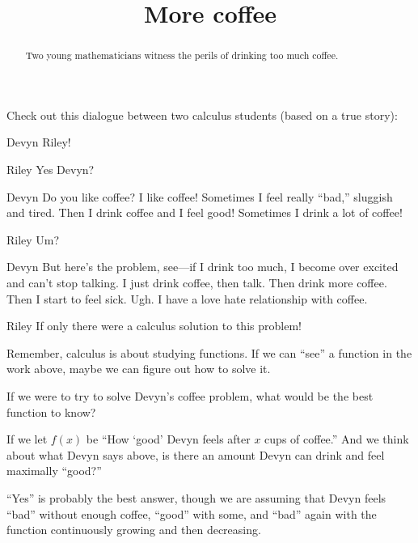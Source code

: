 \documentclass{ximera}
\title[Break-Ground:]{More coffee}
\begin{document}
\begin{abstract}
Two young mathematicians witness the perils of drinking too much
coffee.
\end{abstract}
\maketitle

Check out this dialogue between two calculus students (based on a true
story):

\begin{dialogue}
\item[Devyn] Riley! 
\item[Riley] Yes Devyn?
\item[Devyn] Do you like coffee? I like coffee! Sometimes I feel
  really ``bad,'' sluggish and tired. Then I drink coffee and I feel
  good! Sometimes I drink a lot of coffee!
\item[Riley] Um?
\item[Devyn] But here's the problem, see---if I drink too much, I
  become over excited and can't stop talking. I just drink coffee,
  then talk. Then drink more coffee. Then I start to feel sick. Ugh. I
  have a love hate relationship with coffee.
\item[Riley] If only there were a calculus solution to this problem!
\end{dialogue}

Remember, calculus is about studying functions. If we can ``see'' a function in the work above, maybe we can figure out how to solve it. 

\begin{problem}
  If we were to try to solve Devyn's coffee problem, what would be the best
  function to know?
  \begin{multipleChoice}
  \end{multipleChoice}
\begin{problem}
  If we let $f(x)$ be ``How `good' Devyn feels after $x$ cups of
  coffee.'' And we think about what Devyn says above, is there an amount Devyn can drink and feel maximally ``good?''
  \begin{multipleChoice}
  \end{multipleChoice}
  \begin{feedback}
    ``Yes'' is probably the best answer, though we are assuming that
    Devyn feels ``bad'' without enough coffee, ``good'' with some, and
    ``bad'' again with the function continuously growing and then
    decreasing.
  \end{feedback}
\end{problem}
\end{problem}





\end{document}
